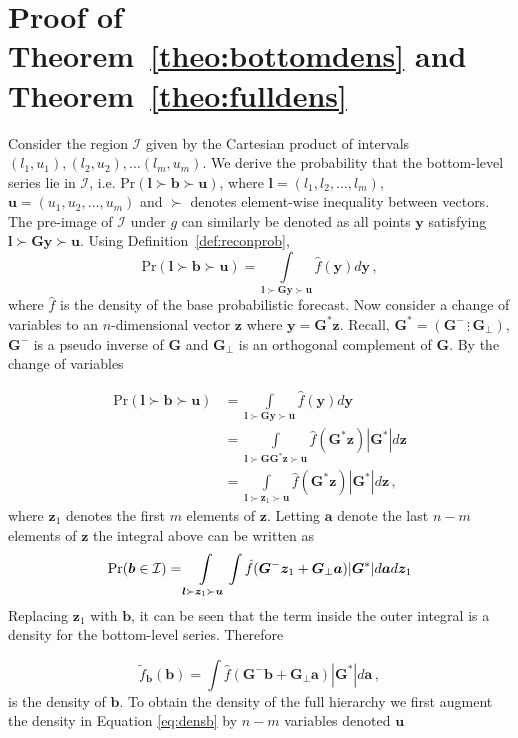 \documentclass[12pt]{article}
\theoremstyle{definition}
\begin{document}
\newpage

\appendix

\section{Proof of Theorem~\ref{theo:bottomdens} and Theorem~\ref{theo:fulldens}} \label{app:Bottom&FullDens}

Consider the region $\mathcal{I}$ given by the Cartesian product of intervals $(l_1,u_1),(l_2,u_2),\ldots(l_m,u_m)$.  We derive the probability that the bottom-level series lie in $\mathcal{I}$, i.e. $\mbox{Pr}(\bm{l}\succ\bm{b}\succ\bm{u})$, where ${\bm l}=(l_1,l_2,\ldots,l_m)$, ${\bm u}=(u_1,u_2,\ldots,u_m)$ and $\succ$ denotes element-wise inequality between vectors.  The pre-image of $\mathcal{I}$ under $g$ can similarly be denoted as all points ${\bm y}$ satisfying $\bm{l}\succ\bm{G}\bm{y}\succ\bm{u}$.  Using Definition~\ref{def:reconprob},
\[
\mbox{Pr}(\bm{l}\succ\bm{b}\succ\bm{u})=\int\limits_{\bm{l}\succ\bm{G}\bm{y}\succ\bm{u}}\hat{f}(\bm{y})d{\bm y}\,,
\]
where $\hat{f}$ is the density of the base probabilistic forecast.  Now consider a change of variables to an $n$-dimensional vector ${\bm z}$ where $\bm{y}={\bm G^*}{\bm z}$. Recall, ${\bm G^*}=\left({\bm G^{-}}\,\vdots\,{\bm G_\perp}\right)$, ${\bm G^{-}}$ is a pseudo inverse of $\bm{G}$ and ${\bm G_\perp}$ is an orthogonal complement of $\bm{G}$.  By the change of variables

\begin{align}
\mbox{Pr}(\bm{l}\succ\bm{b}\succ\bm{u})&=\int\limits_{\bm{l}\succ\bm{G}\bm{y}\succ\bm{u}}\hat{f}(\bm{y})d{\bm y}\nonumber\\
&=\int\limits_{\bm{l}\succ\bm{G}\bm{G}^*\bm{z}\succ\bm{u}}\hat{f}(\bm{G}^*\bm{z})|\bm{G}^*|d{\bm z}\nonumber\\
&=\int\limits_{\bm{l}\succ\bm{z}_1\succ\bm{u}}\hat{f}(\bm{G}^*\bm{z})|\bm{G}^*|d{\bm z}\nonumber\,,
\end{align}
where $\bm{z}_1$ denotes the first $m$ elements of $\bm z$.  Letting $\bm{a}$ denote the last $n-m$ elements of $\bm{z}$ the integral above can be written as
\[
\mbox{Pr}({\bm b}\in \mathcal{I})=\int\limits_{\bm{l}\succ\bm{z}_1\succ\bm{u}}\int\hat{f}(\bm{G}^{-}\bm{z}_1+\bm{G}_{\perp}\bm{a})|\bm{G}^*|d{\bm a}d{\bm z}_1\nonumber\\
\]
Replacing ${\bm z}_1$ with ${\bm b}$, it can be seen that the term inside the outer integral is a density for the bottom-level series. Therefore

\begin{equation}
\tilde{f}_{\bm{b}}(\bm{b})=\int\hat{f}(\bm{G}^{-}\bm{b}+\bm{G}_{\perp}\bm{a})|\bm{G}^*|d{\bm a}\,,
\label{eq:densb}
\end{equation}
is the density of ${\bm b}$. To obtain the density of the full hierarchy we first augment the density in Equation \eqref{eq:densb} by $n-m$ variables denoted $\bm{u}$
\end{document}

